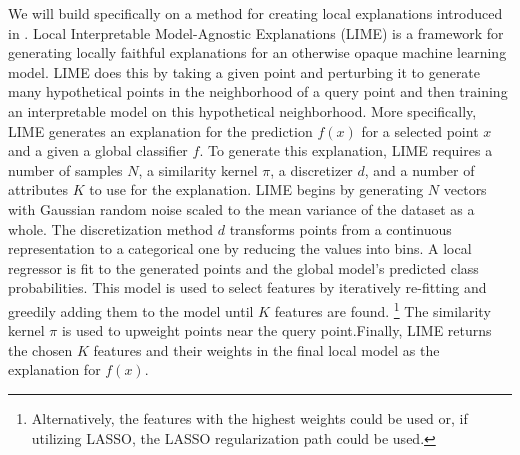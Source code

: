 We will build specifically on a method for creating local explanations introduced in \cite{LIME}. Local Interpretable Model-Agnostic Explanations (LIME) is a framework for generating locally faithful explanations for an otherwise opaque machine learning model. LIME does this by taking a given point and perturbing it to generate many hypothetical points in the neighborhood of a query point and then training an interpretable model on this hypothetical neighborhood. More specifically, LIME generates an explanation for the prediction $f(x)$ for a selected point $x$ and a given a global classifier $f$. To generate this explanation, LIME requires a number of samples $N$, a similarity kernel $\pi$, a discretizer $d$, and a number of attributes $K$ to use for the explanation. LIME begins by generating $N$ vectors with Gaussian random noise scaled to the mean variance of the dataset as a whole. The discretization method $d$ transforms points from a continuous representation to a categorical one by reducing the values into bins. A local regressor is fit to the generated points and the global model's predicted class probabilities. This model is used to select features by iteratively re-fitting and greedily adding them to the model until $K$ features are found. \footnote{Alternatively, the features with the highest weights could be used or, if utilizing LASSO, the LASSO regularization path could be used.}  The similarity kernel $\pi$ is used to upweight points near the query point.Finally, LIME returns the chosen $K$ features and their weights in the final local model as the explanation for $f(x)$.
